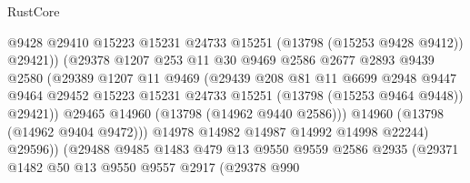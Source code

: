 \begin{lexlean}{RustCore}
\begin{coremodule}
                                  @9428
                                  @29410
                                  @15223
                                  @15231
                                  @24733
                                  @15251
                                  (@13798 (@15253 @9428 @9412))
                                  @29421))
                              (@29378
                                @1207
                                @253
                                @11
                                @30
                                @9469
                                @2586
                                @2677
                                @2893
                                @9439
                                @2580
                                (@29389
                                  @1207
                                  @11
                                  @9469
                                  (@29439
                                    @208
                                    @81
                                    @11
                                    @6699
                                    @2948
                                    @9447
                                    @9464
                                    @29452
                                    @15223
                                    @15231
                                    @24733
                                    @15251
                                    (@13798 (@15253 @9464 @9448))
                                    @29421))
                                @29465
                                @14960
                                (@13798 (@14962 @9440 @2586)))
                              @14960
                              (@13798 (@14962 @9404 @9472)))
                            @14978
                            @14982
                            @14987
                            @14992
                            @14998
                            @22244)
                          @29596))
                      (@29488
                        @9485
                        @1483
                        @479
                        @13
                        @9550
                        @9559
                        @2586
                        @2935
                        (@29371
                          @1482
                          @50
                          @13
                          @9550
                          @9557
                          @2917
                          (@29378
                            @990

\end{coremodule}
\end{lexlean}
